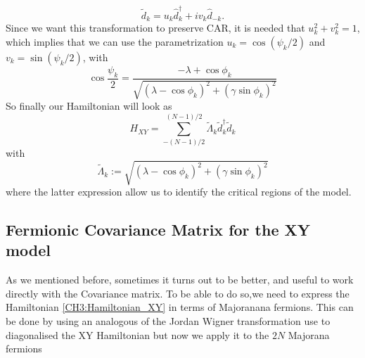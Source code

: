 \begin{equation}
\tilde{d}_{k}=u_{k} \hat{d}_{k}^{\dagger}+i v_{k} \hat{d}_{-k}.
\end{equation}
Since we want this transformation to preserve CAR, it is needed that $u_k^2 + v_k^2 = 1$, which implies that we can use the parametrization $u_{k}=\cos \left(\psi_{k} / 2\right)$ and $v_{k}=\sin \left(\psi_{k} / 2\right)$, with
\begin{equation}
\cos \frac{\psi_{k}}{2}=\frac{-\lambda+\cos \phi_{k}}{\sqrt{\left(\lambda-\cos \phi_{k}\right)^{2}+\left(\gamma \sin \phi_{k}\right)^{2}}}
\end{equation}
So finally our Hamiltonian will look as
\begin{equation}
H_{X Y}=\sum_{-(N-1) / 2}^{(N-1) / 2} \tilde{\Lambda}_{k} \tilde{d}_{k}^{\dagger} \tilde{d}_{k}
\end{equation}
with 
\begin{equation}
\tilde{\Lambda}_{k}:=\sqrt{\left(\lambda-\cos \phi_{k}\right)^{2}+\left(\gamma \sin \phi_{k}\right)^{2}}
\label{CH3:Spectrum_XY_model}
\end{equation}
where the latter expression allow us to identify the critical regions of the model.
\subsection{Fermionic Covariance Matrix for the XY model}

As we mentioned before, sometimes it turns out to be better, and useful to work directly with the Covariance matrix. To be able to do so,we need to express the Hamiltonian \eqref{CH3:Hamiltonian_XY} in terms of Majoranana fermions. This can be done by using an analogous of the Jordan Wigner transformation use to diagonalised the XY Hamiltonian but now we apply it to the $2N$ Majorana fermions

